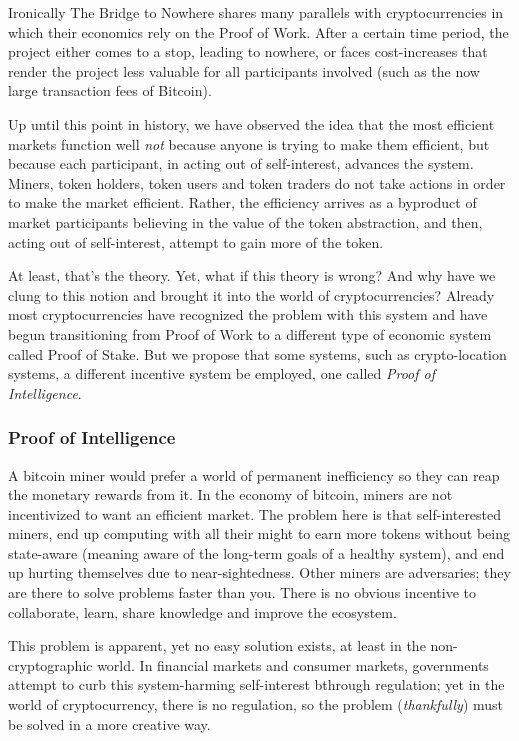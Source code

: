\documentclass{article}
\begin{document}
Ironically The Bridge to Nowhere shares many parallels with cryptocurrencies in which their economics rely on the Proof of Work. After a certain time period, the project either comes to a stop, leading to nowhere, or faces cost-increases that render the project less valuable for all participants involved (such as the now large transaction fees of Bitcoin).

Up until this point in history, we have observed the idea that the most efficient markets function well \textit{not} because anyone is trying to make them efficient, but because each participant, in acting out of self-interest, advances the system. Miners, token holders, token users and token traders do not take actions in order to make the market efficient. Rather, the efficiency arrives as a byproduct of  market participants believing in the value of the token abstraction, and then, acting out of self-interest, attempt to gain more of the token. 

At least, that's the theory. Yet, what if this theory is wrong? And why have we clung to this notion and brought it into the world of cryptocurrencies? Already most cryptocurrencies have recognized the problem with this system and have begun transitioning from Proof of Work to a different type of economic system called Proof of Stake. But we propose that some systems, such as crypto-location systems, a different incentive system be employed, one called \textit{Proof of Intelligence}.

\subsubsection{Proof of Intelligence}

A bitcoin miner would prefer a world of permanent inefficiency so they can reap the monetary rewards from it. In the economy of bitcoin, miners are not incentivized to want an efficient market. The problem here is that self-interested miners, end up computing with all their might to earn more tokens without being state-aware (meaning aware of the long-term goals of a healthy system), and end up hurting themselves due to near-sightedness. Other miners are adversaries; they are there to solve problems faster than you. There is no obvious incentive to collaborate, learn, share knowledge and improve the ecosystem.

This problem is apparent, yet no easy solution exists, at least in the non-cryptographic world. In financial markets and consumer markets, governments attempt to curb this system-harming self-interest bthrough regulation; yet in the world of cryptocurrency, there is no regulation, so the problem (\textit{thankfully}) must be solved in a more creative way.
\end{document}

